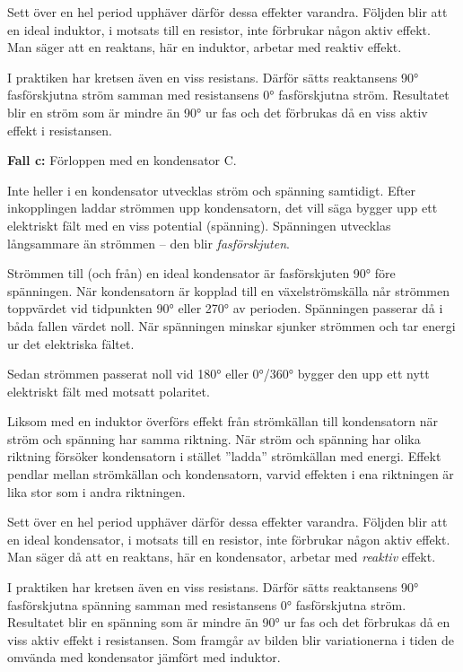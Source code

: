Sett över en hel period upphäver därför dessa effekter varandra.
Följden blir att en ideal induktor, i motsats till en resistor, inte förbrukar
någon aktiv effekt.
Man säger att en reaktans, här en induktor, arbetar med reaktiv effekt.

I praktiken har kretsen även en viss resistans.
Därför sätts reaktansens \ang{90} fasförskjutna ström samman med resistansens
\ang{0} fasförskjutna ström.
Resultatet blir en ström som är mindre än \ang{90} ur fas och det förbrukas då
en viss aktiv effekt i resistansen.

\textbf{Fall c:} Förloppen med en kondensator C.

Inte heller i en kondensator utvecklas ström och spänning samtidigt.
Efter inkopplingen laddar strömmen upp kondensatorn, det vill säga bygger upp
ett elektriskt fält med en viss potential (spänning).
Spänningen utvecklas långsammare än strömmen -- den blir \emph{fasförskjuten}.

Strömmen till (och från) en ideal kondensator är fasförskjuten \ang{90} före
spänningen.
När kondensatorn är kopplad till en växelströmskälla når strömmen toppvärdet vid
tidpunkten \ang{90} eller \ang{270} av perioden.
Spänningen passerar då i båda fallen värdet noll.
När spänningen minskar sjunker strömmen och tar energi ur det elektriska fältet.

Sedan strömmen passerat noll vid \ang{180} eller \ang{0}/\ang{360} bygger den
upp ett nytt elektriskt fält med motsatt polaritet.

Liksom med en induktor överförs effekt från strömkällan till kondensatorn när
ström och spänning har samma riktning.
När ström och spänning har olika riktning försöker kondensatorn i stället
''ladda'' strömkällan med energi.
Effekt pendlar mellan strömkällan och kondensatorn, varvid effekten i
ena riktningen är lika stor som i andra riktningen.

Sett över en hel period upphäver därför dessa effekter varandra.
Följden blir att en ideal kondensator, i motsats till en resistor, inte
förbrukar någon aktiv effekt.
Man säger då att en reaktans, här en kondensator, arbetar med \emph{reaktiv}
effekt.

I praktiken har kretsen även en viss resistans.
Därför sätts reaktansens \ang{90} fasförskjutna spänning samman med
resistansens \ang{0} fasförskjutna ström.
Resultatet blir en spänning som är mindre än \ang{90} ur fas och det
förbrukas då en viss aktiv effekt i resistansen.
Som framgår av bilden blir variationerna i tiden de omvända med kondensator
jämfört med induktor.

